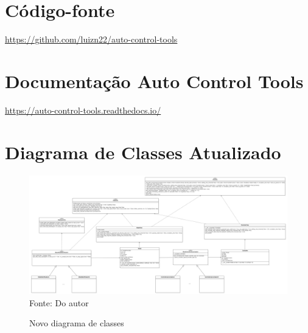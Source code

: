 \chapter{Código-fonte}
\label{ch:actgithub}
\url{https://github.com/luizn22/auto-control-tools}

\chapter{Documentação Auto Control Tools}
\label{ch:actdocs}
\url{https://auto-control-tools.readthedocs.io/}

\chapter{Diagrama de Classes Atualizado}
\label{ch:nwclassdiag}

\begin{figure}[H]
    \centering
    \caption{Novo diagrama de classes}
    \includegraphics[scale=0.23, angle=90]{figuras/class_diag_new}
    \label{fig:class_diag_new}
    \\
    \vspace{0cm}\hspace{0cm}\small{Fonte: Do autor}
\end{figure}

